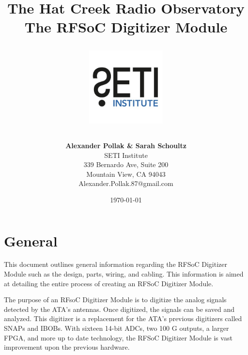 \documentclass[12pt,a4paper,oneside]{article}
\title{\Huge The Hat Creek Radio Observatory\\
\vspace{0.5cm}
The RFSoC Digitizer Module\\
\vspace{0.5cm}
\normalsize \emph{}
\vspace{3.5cm}
\begin{center}
\includegraphics[height=4cm]{titlepage/SETI_institute_logo.jpg}
\end{center}
}
\author{ 
\vspace{1cm}
\Large
\textbf{ Alexander Pollak \& Sarah Schoultz} \\
SETI Institute \\ 
339 Bernardo Ave, Suite 200 \\
Mountain View, CA 94043 \\ 
Alexander.Pollak.87@gmail.com\\
}
\date{\today}
\begin{document}
\clearpage\maketitle
\thispagestyle{empty}

%



%

\newpage

\section{General}
\label{sec:1}
This document outlines general information regarding the RFSoC Digitizer Module such as the design, parts, wiring, and cabling. This information is aimed at detailing the entire process of creating an RFSoC Digitizer Module.

The purpose of an RFsoC Digitizer Module is to digitize the analog signals detected by the ATA's antennas. Once digitized, the signals can be saved and analyzed. This digitizer is a replacement for the ATA's previous digitizers called SNAPs and IBOBs. With sixteen 14-bit ADCs, two 100 G outputs, a larger FPGA, and more up to date technology, the RFSoC Digitizer Module is vast improvement upon the previous hardware. 


\end{document}
